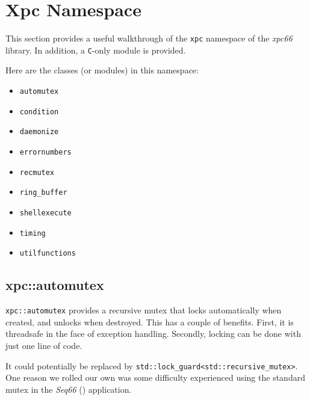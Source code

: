 %
%
%

\section{Xpc Namespace}
\label{sec:xpc_namespace}

   This section provides a useful walkthrough of the \texttt{xpc} namespace of
   the \textsl{xpc66} library.
   In addition, a \texttt{C}-only module is provided.

   Here are the classes (or modules) in this namespace:

   \begin{itemize}
      \item \texttt{automutex}
      \item \texttt{condition}
      \item \texttt{daemonize}
      \item \texttt{errornumbers}
      \item \texttt{recmutex}
      \item \texttt{ring\_buffer}
      \item \texttt{shellexecute}
      \item \texttt{timing}
      \item \texttt{utilfunctions}
   \end{itemize}

\subsection{xpc::automutex}
\label{subsec:xpc_namespace_automutex}

   \texttt{xpc::automutex} provides a recursive
   mutex that locks automatically when
   created, and unlocks when destroyed.  This has a couple of benefits.
   First, it is threadsafe in the face of exception handling.
   Secondly, locking can be done with just one line of code.

   It could potentially be replaced by
   \texttt{std::lock\_guard<std::recursive\_mutex>}.
   One reason we rolled our own was some difficulty experienced using
   the standard mutex in the \textsl{Seq66} (\cite{seq66}) application.

